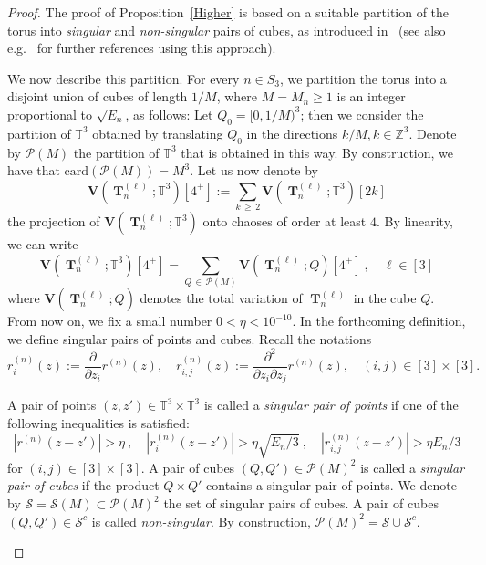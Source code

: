 \documentclass[AHL,Unicode,longabstracts,published]{cedram}
\DeclareMathOperator{\bT}{\mathbf{T}}
\newcommand{\bfv}{\mathbf{V}}
\newcommand{\clP}{\mathcal{P}}
\newcommand{\clS}{\mathcal{S}}
\newcommand{\Z}{\mathbb{Z}}
\newcommand{\T}{\mathbb{T}^3}
\begin{document}
\begin{proof}
The proof of Proposition~\ref{Higher} is based on a suitable partition of the torus into \emph{singular} and \emph{non-singular} pairs of cubes, as introduced in~\cite{ORW08} (see also e.g.~\cite{DNPR16,Not20,PR16} for further references using this approach).


We now describe this partition. For every $n \in S_3$, we partition the torus into a disjoint union of cubes of length $1/M$, where $M=M_n\geq1$ is an integer proportional to $\sqrt{E_n}$, as follows: Let $Q_0 = [0,1/M)^3$; then we consider the partition of $\T$ obtained by translating $Q_0$ in the directions $k/M,k \in \Z^3$. Denote by $\clP(M)$ the partition of $\T$ that is obtained in this way. By construction, we have that $\textrm{card}({\clP(M)})=M^3$. Let us now denote by
\[
\bfv\left(\bT_n^{(\ell)};\T\right)\left[4^+\right]:= \sum_{k\,\geq\,2} \bfv\left(\bT_n^{(\ell)};\T\right)[2k]
\]
the projection of $\bfv(\bT_n^{(\ell)};\T)$ onto chaoses of order at least $4$. By linearity, we can write
\begin{equation}\label{decomp}
\bfv\left(\bT_n^{(\ell)};\T\right)\left[4^+\right] = \sum_{Q\,\in \,\clP(M)} \bfv\left(\bT_n^{(\ell)};Q\right)\left[4^+\right] \ , \quad \ell \in [3]
\end{equation}
where $ \bfv(\bT_n^{(\ell)};Q)$ denotes the total variation of $\bT_n^{(\ell)}$ in the cube $Q$. From now on, we fix a small number $0 < \eta < 10^{- 10}$. In the forthcoming definition, we define singular pairs of points and cubes. Recall the notations
\[
r_i^{(n)}(z):= \frac{\partial}{\partial z_i} r^{(n)}(z), \quad r^{(n)}_{i,j}(z):= \frac{\partial^2}{\partial z_i \partial z_j}r^{(n)}(z), \quad (i,j)\in [3]\times [3].
\]
\begin{defi}\label{DefSing}
A pair of points $(z,z') \in \T \times \T $ is called a \emph{singular pair of points} if one of the following inequalities is satisfied:
\begin{equation*}
\left|r^{(n)}(z-z')\right| > \eta \ , \quad \left| r^{(n)}_i(z-z')\right| > \eta \sqrt{E_n/3} \ , \quad \left| r^{(n)}_{i,j} (z-z')\right| > \eta E_n/3
\end{equation*}
for $(i, j) \in [3]\times[3]$. A pair of cubes $(Q, Q') \in \clP(M)^2 $ is called a \emph{singular pair of cubes} if the product $Q\times Q'$ contains a singular pair of points. We denote by $\clS=\clS(M) \subset \clP(M)^2$ the set of singular pairs of cubes. A pair of cubes $(Q,Q') \in \clS^c$ is called \emph{non-singular}. By construction, $\clP(M)^2 = \clS \cup \clS^c$.
\end{defi}


\end{proof}
\end{document}
